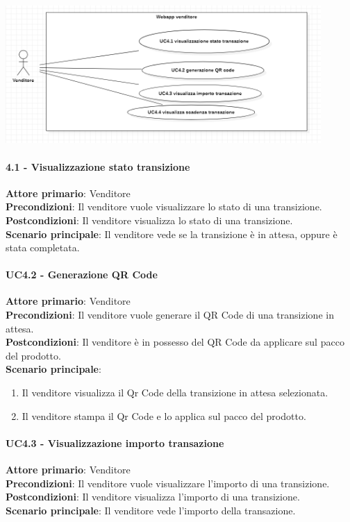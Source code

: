 \documentclass[a4paper, 12pt]{article}
\begin{document}
\includegraphics[width=0.9\textwidth]{UseCase_venditore4.png}

\paragraph{4.1 - Visualizzazione stato transizione}
\textbf{Attore primario}: Venditore\\
\textbf{Precondizioni}: Il venditore vuole visualizzare lo stato di una transizione.\\
\textbf{Postcondizioni}: Il venditore visualizza lo stato di una transizione.\\
\textbf{Scenario principale}: Il venditore vede se la transizione è in attesa, oppure è stata completata.\\

\paragraph{UC4.2 - Generazione QR Code}
\textbf{Attore primario}: Venditore\\
\textbf{Precondizioni}: Il venditore vuole generare il QR Code di una transizione in attesa.\\
\textbf{Postcondizioni}: Il venditore è in possesso del QR Code da applicare sul pacco del prodotto.\\
\textbf{Scenario principale}:
\begin{enumerate}
\item Il venditore visualizza il Qr Code della transizione in attesa selezionata.
\item Il venditore stampa il Qr Code e lo applica sul pacco del prodotto.
\end{enumerate}

\paragraph{UC4.3 - Visualizzazione importo transazione}
\textbf{Attore primario}: Venditore\\
\textbf{Precondizioni}: Il venditore vuole visualizzare l'importo di una transizione.\\
\textbf{Postcondizioni}: Il venditore visualizza l'importo di una transizione.\\
\textbf{Scenario principale}: Il venditore vede l'importo della transazione.\\
\end{document}
